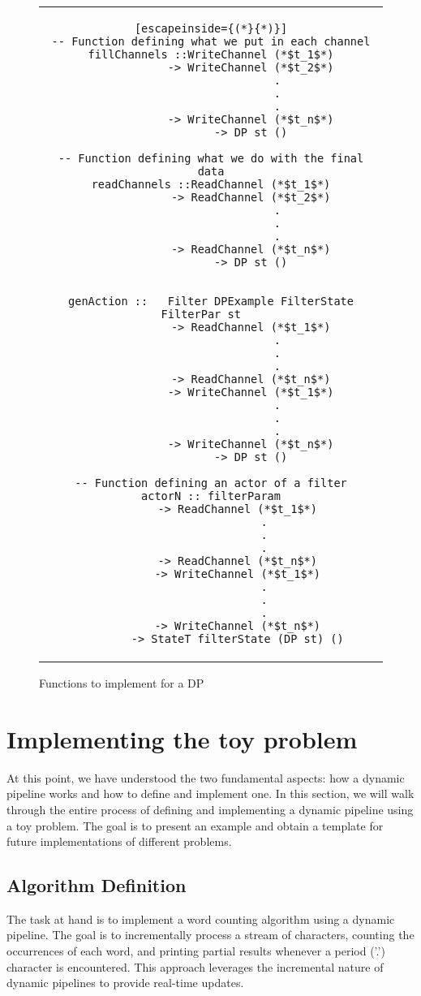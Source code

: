 \begin{figure}[H]
    \begin{tabular}{c}
        \begin{lstlisting}[escapeinside={(*}{*)}]
-- Function defining what we put in each channel
fillChannels ::WriteChannel (*$t_1$*)
            -> WriteChannel (*$t_2$*)
                    .
                    .
                    .
            -> WriteChannel (*$t_n$*)
            -> DP st ()

-- Function defining what we do with the final data
readChannels ::ReadChannel (*$t_1$*)
            -> ReadChannel (*$t_2$*)
                    .
                    .
                    .
            -> ReadChannel (*$t_n$*)
            -> DP st ()


genAction ::   Filter DPExample FilterState FilterPar st   
            -> ReadChannel (*$t_1$*)
                    .
                    .
                    .
            -> ReadChannel (*$t_n$*)
            -> WriteChannel (*$t_1$*)
                    .
                    .
                    .
            -> WriteChannel (*$t_n$*)
            -> DP st ()

-- Function defining an actor of a filter
actorN :: filterParam
        -> ReadChannel (*$t_1$*)
                .
                .
                .
        -> ReadChannel (*$t_n$*)
        -> WriteChannel (*$t_1$*)
                .
                .
                .
        -> WriteChannel (*$t_n$*)
        -> StateT filterState (DP st) ()
        \end{lstlisting}
    \end{tabular}
    \caption{Functions to implement for a DP}
    \label{fig:HC15}
\end{figure}

\section{Implementing the toy problem}
At this point, we have understood the two fundamental aspects: how a dynamic pipeline works and how to define and implement one.
In this section, we will walk through the entire process of defining and implementing a dynamic pipeline using a toy problem.
The goal is to present an example and obtain a template for future implementations of different problems.
\subsection{Algorithm Definition}
The task at hand is to implement a word counting algorithm using a dynamic pipeline.
The goal is to incrementally process a stream of characters, counting the occurrences of each word, and printing partial results whenever a period ('.') character is encountered.
This approach leverages the incremental nature of dynamic pipelines to provide real-time updates. \\

